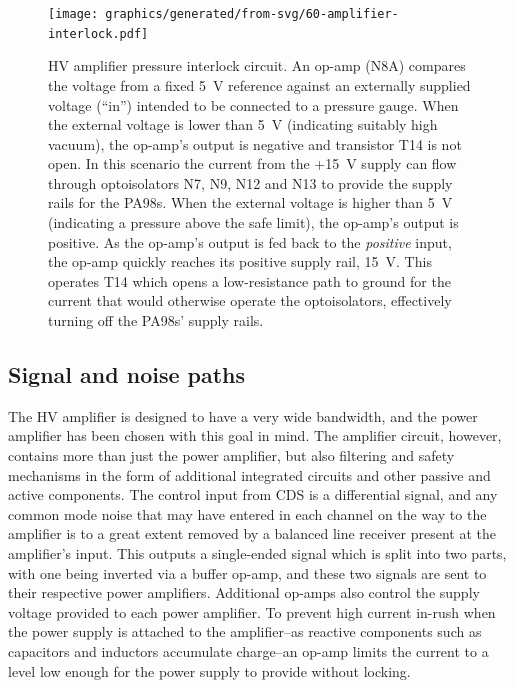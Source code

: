 
\begin{figure}
  \centering
  \texttt{[image: graphics/generated/from-svg/60-amplifier-interlock.pdf]}
  \caption{\gls{HV} amplifier pressure interlock circuit. An op-amp (N8A) compares the voltage from a fixed \SI{5}{\volt} reference against an externally supplied voltage (``in'') intended to be connected to a pressure gauge. When the external voltage is lower than \SI{5}{\volt} (indicating suitably high vacuum), the op-amp's output is negative and transistor T14 is not open. In this scenario the current from the +\SI{15}{\volt} supply can flow through optoisolators N7, N9, N12 and N13 to provide the supply rails for the PA98s. When the external voltage is higher than \SI{5}{\volt} (indicating a pressure above the safe limit), the op-amp's output is positive. As the op-amp's output is fed back to the \emph{positive} input, the op-amp quickly reaches its positive supply rail, \SI{15}{\volt}. This operates T14 which opens a low-resistance path to ground for the current that would otherwise operate the optoisolators, effectively turning off the PA98s' supply rails.}
  \label{fig:amplifier-interlock}
\end{figure}

\subsection{\label{sec:signal-and-noise-paths}Signal and noise paths}
The \gls{HV} amplifier is designed to have a very wide bandwidth, and the power amplifier has been chosen with this goal in mind. The amplifier circuit, however, contains more than just the power amplifier, but also filtering and safety mechanisms in the form of additional integrated circuits and other passive and active components. The control input from \gls{CDS} is a differential signal, and any common mode noise that may have entered in each channel on the way to the amplifier is to a great extent removed by a balanced line receiver present at the amplifier's input. This outputs a single-ended signal which is split into two parts, with one being inverted via a buffer op-amp, and these two signals are sent to their respective power amplifiers. Additional op-amps also control the supply voltage provided to each power amplifier. To prevent high current in-rush when the power supply is attached to the amplifier--as reactive components such as capacitors and inductors accumulate charge--an op-amp limits the current to a level low enough for the power supply to provide without locking.


